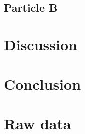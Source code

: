 \documentclass[]{report}
\begin{document}
\section{Particle B}



\chapter{Discussion}


\chapter{Conclusion}


\appendix
\chapter{Raw data}

%
%
%
%
%


\end{document}
